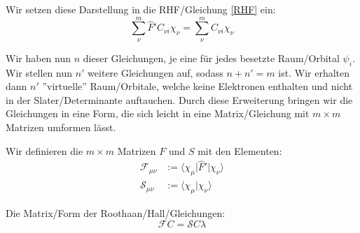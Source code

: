Wir setzen diese Darstellung in die RHF\-/Gleichung \cref{RHF} ein:
\begin{equation}
  \sum_\nu^m \hat{F}' C_{\nu i} \chi_\nu = \sum_\nu^m C_{\nu i} \chi_\nu
\end{equation}

Wir haben nun $n$ dieser Gleichungen, je eine für jedes besetzte Raum\-/Orbital $\psi_i$.
Wir stellen nun $n'$ weitere Gleichungen auf, sodass $n + n' = m$ ist.
Wir erhalten dann $n'$ ''virtuelle'' Raum\-/Orbitale, welche keine Elektronen enthalten und
nicht in der Slater\-/Determinante auftauchen.
Durch diese Erweiterung bringen wir die Gleichungen in eine Form,
die sich leicht in eine Matrix\-/Gleichung mit $m\times m$ Matrizen umformen lässt.

Wir definieren die $m\times m$ Matrizen $F$ und $S$ mit den Elementen:
\begin{align}
  \mathcal{F}_{\mu \nu} &:= \langle \chi_\mu \vert \hat{F}' \vert \chi_\nu \rangle\\
  \mathcal{S}_{\mu \nu} &:= \langle \chi_\mu \vert \chi_\nu \rangle
\end{align}

Die Matrix\-/Form der Roothaan\-/Hall\-/Gleichungen:
\begin{equation} \label{roothaan_mtx}
  \mathcal{F}C = \mathcal{S}C\lambda
\end{equation}

